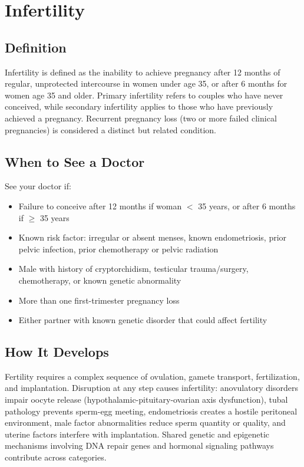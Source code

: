 \chapter{Infertility}

\section*{Definition}
Infertility is defined as the inability to achieve pregnancy after 12 months of regular, unprotected intercourse in women under age 35, or after 6 months for women age 35 and older. Primary infertility refers to couples who have never conceived, while secondary infertility applies to those who have previously achieved a pregnancy. Recurrent pregnancy loss (two or more failed clinical pregnancies) is considered a distinct but related condition.

\section*{When to See a Doctor}
See your doctor if:
\begin{itemize}
  \item Failure to conceive after 12 months if woman $<$ 35 years, or after 6 months if $\ge$ 35 years
  \item Known risk factor: irregular or absent menses, known endometriosis, prior pelvic infection, prior chemotherapy or pelvic radiation
  \item Male with history of cryptorchidism, testicular trauma/surgery, chemotherapy, or known genetic abnormality
  \item More than one first-trimester pregnancy loss
  \item Either partner with known genetic disorder that could affect fertility
\end{itemize}

\section*{How It Develops}
Fertility requires a complex sequence of ovulation, gamete transport, fertilization, and implantation. Disruption at any step causes infertility: anovulatory disorders impair oocyte release (hypothalamic-pituitary-ovarian axis dysfunction), tubal pathology prevents sperm-egg meeting, endometriosis creates a hostile peritoneal environment, male factor abnormalities reduce sperm quantity or quality, and uterine factors interfere with implantation. Shared genetic and epigenetic mechanisms involving DNA repair genes and hormonal signaling pathways contribute across categories.

